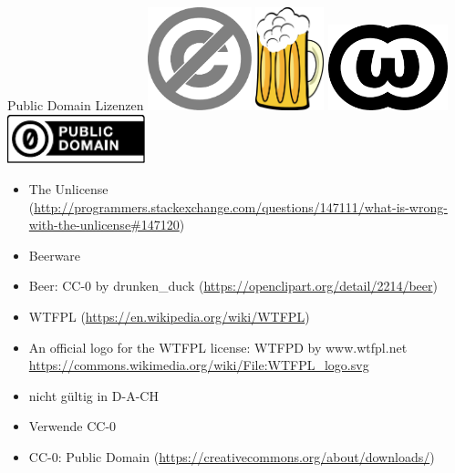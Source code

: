 {\begin{frame}{Public Domain Lizenzen}
	\includegraphics[height=3cm]{res/PD-icon.pdf}
	\hfill
	\includegraphics[height=3cm]{res/beer.pdf}
	\hfill
	\includegraphics[height=2.5cm]{res/WTFPL_logo.pdf}
	\\
	\includegraphics[width=4cm]{res/cc-zero.pdf}
\end{frame}
\note
{
	\begin{itemize}
		\item The Unlicense (\url{http://programmers.stackexchange.com/questions/147111/what-is-wrong-with-the-unlicense\#147120})
		\item Beerware
		\item Beer: CC-0 by drunken\_duck (\url{https://openclipart.org/detail/2214/beer})
		\item WTFPL (\url{https://en.wikipedia.org/wiki/WTFPL})
		\item An official logo for the WTFPL license: WTFPD by www.wtfpl.net \url{https://commons.wikimedia.org/wiki/File:WTFPL_logo.svg}
		\item nicht gültig in D-A-CH
		\item Verwende CC-0
		\item CC-0: Public Domain (\url{https://creativecommons.org/about/downloads/})
	\end{itemize}
}

}

